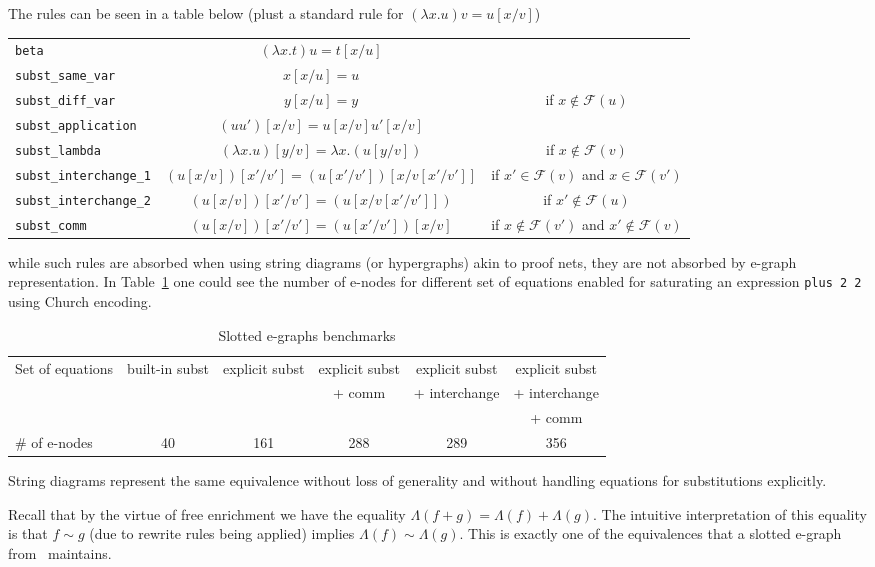 \documentclass[acmsmall,screen, nonacm, anonymous]{acmart}
\begin{document}
The rules can be seen in a table below (plust a standard rule for $(\lambda x . u)v = u[x / v]$)

\begin{tabular}{lcc}
\texttt{beta} & $(\lambda x . t) u = t[x / u]$&\\
\texttt{subst\_same\_var} & $x[x / u] = u$ &\\
\texttt{subst\_diff\_var} & $y[x / u] = y$ & if $x \not \in \mathcal{F}(u)$\\
\texttt{subst\_application} & $(uu')[x / v] = u[x / v]u'[x / v]$ & \\
\texttt{subst\_lambda} & $(\lambda x . u)[y / v] = \lambda x . (u[y / v])$ & if $x \not \in \mathcal{F}(v)$ \\
\texttt{subst\_interchange\_1} & $(u[x / v])[x' / v'] = (u[x' / v'])[x / v[x' / v']]$ & if $x' \in \mathcal{F}(v)$ and $x \in \mathcal{F}(v')$\\
\texttt{subst\_interchange\_2} & $(u[x / v])[x' / v'] = (u[x / v[x' / v']])$ & if $x' \not \in \mathcal{F}(u)$\\
\texttt{subst\_comm} & $(u[x / v])[x' / v'] = (u[x' / v'])[x / v]$ & if $x \not \in \mathcal{F}(v')$ and $x' \not \in \mathcal{F}(v)$\\
\end{tabular}

while such rules are absorbed when using string diagrams (or hypergraphs) akin to proof nets, they are not absorbed by e-graph representation.
In Table~\ref{tbl:slotted} one could see the number of e-nodes for different set of equations enabled for saturating an expression \texttt{plus 2 2} using Church encoding.

\begin{table}
\begin{tabular}{lccccc}
  Set of equations & built-in subst & explicit subst & explicit subst & explicit subst & explicit subst\\
  &&& + comm& + interchange&  + interchange\\
  &&&&&  + comm\\
  \# of e-nodes & 40 & 161 & 288 & 289 & 356
\end{tabular}
\caption{Slotted e-graphs benchmarks}
\label{tbl:slotted}
\end{table}

String diagrams represent the same equivalence without loss of generality and without handling equations for substitutions explicitly.

Recall that by the virtue of free enrichment we have the equality $\Lambda(f + g) = \Lambda(f) + \Lambda(g)$.
The intuitive interpretation of this equality is that $f \sim g$ (due to rewrite rules being applied) implies $\Lambda(f) \sim \Lambda(g)$.
This is exactly one of the equivalences that a slotted e-graph from~\cite{slotted-egraphs} maintains.
\end{document}
